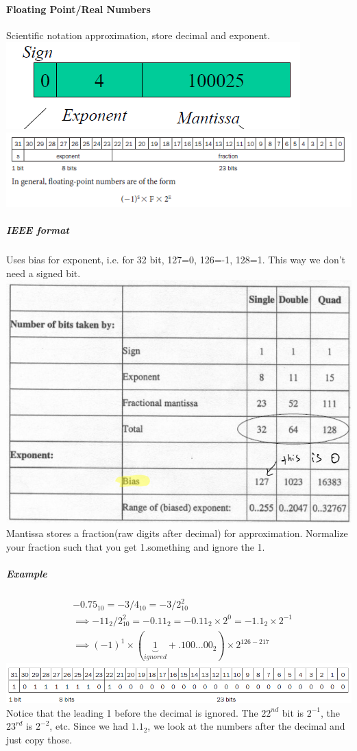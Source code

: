 \documentclass[12 pt]{article}
\begin{document}
	\paragraph{Floating Point/Real Numbers} Scientific notation approximation, store decimal and exponent.
	\includegraphics[scale=0.5]{fp} \includegraphics[scale=0.6]{fp32}
	\subparagraph{IEEE format} Uses bias for exponent, i.e. for 32 bit, 127=0, 126=-1, 128=1. This way we don't need a signed bit.
	\includegraphics[scale=0.5]{ieeefp}
	\\ Mantissa stores a fraction(raw digits after decimal) for approximation. Normalize your fraction such that you get 1.something and ignore the 1. \subparagraph{Example}
	\begin{align*}
		& -0.75_{10}=-3/4_{10}=-3/2^2_{10} \\
		& \implies -11_2/2^2_{10}=-0.11_2=-0.11_2 \times 2^0=-1.1_2 \times 2^{-1}
		\\& \implies (-1)^1 \times (\underbrace{1}_{ignored}+ .100 \ldots 00_2) \times 2^{126-217}
	\end{align*}
	\includegraphics[scale=0.7]{exfpm}
	Notice that the leading 1 before the decimal is ignored. The $22^{nd}$ bit is $2^{-1}$, the $23^{rd}$ is $2^{-2}$, etc. Since we had $1.1_2$, we look at the numbers after the decimal and just copy those.
\end{document}
